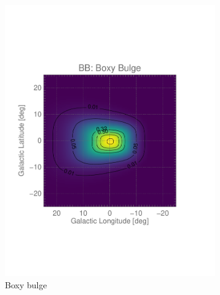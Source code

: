 \documentclass[doublespace,nopageskip]{VTthesis}
\begin{document}
\begin{figure}[htb]
	\centering
	\begin{subfigure}[h]{0.32\textwidth}
		\centering
		\includegraphics[width=1\textwidth,trim=0.44in 2.03in 1.29in 2.34in,clip=true]{Figures/511keV/map_BB_asinh_grid.pdf}
		\caption{Boxy bulge}
		\label{fig:bb_los}
	\end{subfigure}
	\begin{subfigure}[h]{0.32\textwidth}
		\centering

\end{subfigure}
\end{figure}
\end{document}
